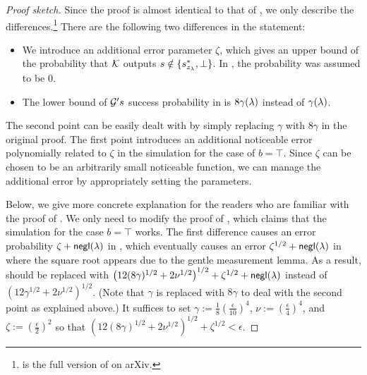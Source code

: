 \begin{proof}[Proof sketch]
    Since the proof is almost identical to that of \cite[Lemma 20]{arXiv:LPY23}, we only describe the differences.\footnote{\cite{arXiv:LPY23} is the full version of \cite{FOCS:LPY23} on arXiv.} 
    There are the following two differences in the statement:
    \begin{itemize}
    \item We introduce an additional error parameter $\zeta$, which gives an upper bound of the probability that $\mathcal{K}$ outputs $s\notin \{s^*_{z_\lambda},\bot\}$. In \cite[Lemma 20]{arXiv:LPY23}, the probability was assumed to be $0$.
    \item The lower bound of $\mathcal{G}'s$ success probability in  is $8\gamma(\lambda)$ instead of $\gamma(\lambda)$. 
    \end{itemize}
The second point can be easily dealt with by simply replacing $\gamma$ with $8\gamma$ in the original proof.
The first point introduces an additional noticeable error polynomially related to $\zeta$ in the simulation for the case of $b=\top$.
Since $\zeta$ can be chosen to be an arbitrarily small noticeable function, we can manage the additional error by appropriately setting the parameters. 

Below, we give more concrete explanation for the readers who are familiar with the proof of \cite[Lemma 20]{arXiv:LPY23}. %
We only need to modify the proof of \cite[Lemma 26]{arXiv:LPY23}, which claims that the simulation for the case $b=\top$ works.  
The first difference causes an error probability $\zeta+\mathsf{negl}(\lambda)$ in \cite[Claims 29 and 30]{arXiv:LPY23}, which eventually causes an error $\zeta^{1/2}+\mathsf{negl}(\lambda)$ in \cite[Eq. (84)]{arXiv:LPY23} where the square root appears due to the gentle measurement lemma.
As a result, \cite[Eq. (84)]{arXiv:LPY23} should be replaced with  $\left(12(8\gamma)^{1/2}+2\nu^{1/2}\right)^{1/2}+\zeta^{1/2}+\mathsf{negl}(\lambda)$ instead of $\left(12\gamma^{1/2}+2\nu^{1/2}\right)^{1/2}$.
(Note that $\gamma$ is replaced with $8\gamma$ to deal with the second point as explained above.) 
It suffices to set 
$
\gamma:=\frac{1}{8}\left(\frac{\epsilon}{10}\right)^4$, 
$\nu:=\left(\frac{\epsilon}{4}\right)^4$, and 
$\zeta:=\left(\frac{\epsilon}{2}\right)^2$ so that $\left(12(8\gamma)^{1/2}+2\nu^{1/2}\right)^{1/2}+\zeta^{1/2}<\epsilon$.
\end{proof}

